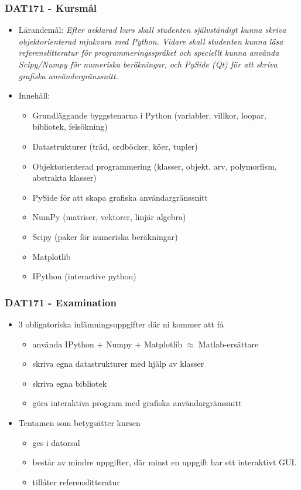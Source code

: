 \documentclass{beamer}
\begin{document}
\begin{frame}
\frametitle{DAT171 - Kursmål}
\begin{itemize}
 \item Lärandemål: \textit{ Efter avklarad kurs skall studenten självständigt kunna skriva objektorienterad mjukvara med Python.
 Vidare skall studenten kunna läsa referenslitteratur för programmeringsspråket och speciellt kunna använda Scipy/Numpy för numeriska beräkningar, och PySide (Qt) för att skriva grafiska användergränssnitt.}
 \item Innehåll:
 \begin{itemize}
  \item Grundläggande byggstenarna i Python (variabler, villkor, loopar, bibliotek, felsökning)
  \item Datastrukturer (träd, ordböcker, köer, tupler)
  \item Objektorienterad programmering (klasser, objekt, arv, polymorfism, abstrakta klasser)
  \item PySide för att skapa grafiska användargränssnitt
  \item NumPy (matriser, vektorer, linjär algebra)
  \item Scipy (paker för numeriska beräkningar)
  \item Matplotlib
  \item IPython (interactive python)
 \end{itemize}
\end{itemize}
\end{frame}

\begin{frame}
\frametitle{DAT171 - Examination}
\begin{itemize}
 \item 3 obligatoriska inlämningsuppgifter där ni kommer att få
 \begin{itemize}
 \item använda IPython + Numpy + Matplotlib $\approx$ Matlab-ersättare
 \item skriva egna datastrukturer med hjälp av klasser
 \item skriva egna bibliotek
 \item göra interaktiva program med grafiska användargränssnitt
 \end{itemize}
 \item Tentamen som betygsätter kursen
 \begin{itemize}
  \item ges i datorsal
  \item består av mindre uppgifter, där minst en uppgift har ett interaktivt GUI.
  \item tillåter referenslitteratur
 \end{itemize}
\end{itemize}
\end{frame}
\end{document}
